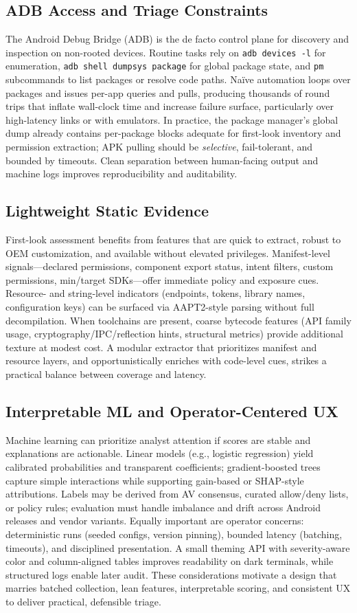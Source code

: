 \documentclass[10pt,conference]{IEEEtran}
\begin{document}
\subsection{ADB Access and Triage Constraints}
The Android Debug Bridge (ADB) is the de facto control plane for discovery and inspection on non-rooted devices. Routine tasks rely on \texttt{adb devices -l} for enumeration, \texttt{adb shell dumpsys package} for global package state, and \texttt{pm} subcommands to list packages or resolve code paths. Naïve automation loops over packages and issues per-app queries and pulls, producing thousands of round trips that inflate wall-clock time and increase failure surface, particularly over high-latency links or with emulators. In practice, the package manager’s global dump already contains per-package blocks adequate for first-look inventory and permission extraction; APK pulling should be \emph{selective}, fail-tolerant, and bounded by timeouts. Clean separation between human-facing output and machine logs improves reproducibility and auditability.

\subsection{Lightweight Static Evidence}
First-look assessment benefits from features that are quick to extract, robust to OEM customization, and available without elevated privileges. Manifest-level signals—declared permissions, component export status, intent filters, custom permissions, min/target SDKs—offer immediate policy and exposure cues. Resource- and string-level indicators (endpoints, tokens, library names, configuration keys) can be surfaced via AAPT2-style parsing without full decompilation. When toolchains are present, coarse bytecode features (API family usage, cryptography/IPC/reflection hints, structural metrics) provide additional texture at modest cost. A modular extractor that prioritizes manifest and resource layers, and opportunistically enriches with code-level cues, strikes a practical balance between coverage and latency.

\subsection{Interpretable ML and Operator-Centered UX}
Machine learning can prioritize analyst attention if scores are stable and explanations are actionable. Linear models (e.g., logistic regression) yield calibrated probabilities and transparent coefficients; gradient-boosted trees capture simple interactions while supporting gain-based or SHAP-style attributions. Labels may be derived from AV consensus, curated allow/deny lists, or policy rules; evaluation must handle imbalance and drift across Android releases and vendor variants. Equally important are operator concerns: deterministic runs (seeded configs, version pinning), bounded latency (batching, timeouts), and disciplined presentation. A small theming API with severity-aware color and column-aligned tables improves readability on dark terminals, while structured logs enable later audit. These considerations motivate a design that marries batched collection, lean features, interpretable scoring, and consistent UX to deliver practical, defensible triage.
\end{document}
